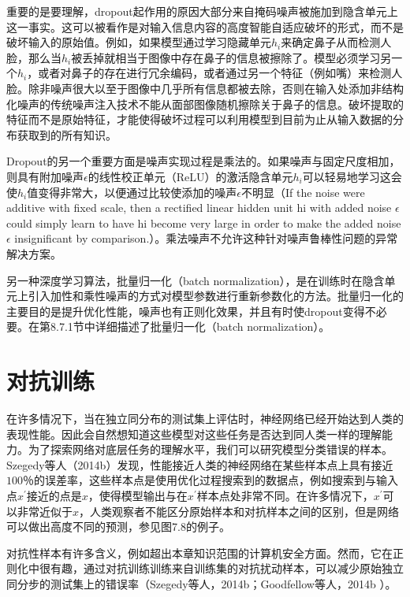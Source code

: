 重要的是要理解，dropout起作用的原因大部分来自掩码噪声被施加到隐含单元上这一事实。这可以被看作是对输入信息内容的高度智能自适应破坏的形式，而不是破坏输入的原始值。例如，如果模型通过学习隐藏单元$h_i$来确定鼻子从而检测人脸，那么当$h_i$被丢掉就相当于图像中存在鼻子的信息被擦除了。模型必须学习另一个$h_i$，或者对鼻子的存在进行冗余编码，或者通过另一个特征（例如嘴）来检测人脸。除非噪声很大以至于图像中几乎所有信息都被去除，否则在输入处添加非结构化噪声的传统噪声注入技术不能从面部图像随机擦除关于鼻子的信息。破坏提取的特征而不是原始特征，才能使得破坏过程可以利用模型到目前为止从输入数据的分布获取到的所有知识。

Dropout的另一个重要方面是噪声实现过程是乘法的。如果噪声与固定尺度相加，则具有附加噪声$\epsilon$的线性校正单元（ReLU）的激活隐含单元$h_i$可以轻易地学习这会使$h_i$值变得非常大，以便通过比较使添加的噪声$\epsilon$不明显（If the noise were additive with ﬁxed scale, then a rectiﬁed linear hidden unit hi with added noise $\epsilon$ could simply learn to have hi become very large in order to make the added noise $\epsilon$ insigniﬁcant by comparison.）。乘法噪声不允许这种针对噪声鲁棒性问题的异常解决方案。

另一种深度学习算法，批量归一化（batch normalization），是在训练时在隐含单元上引入加性和乘性噪声的方式对模型参数进行重新参数化的方法。批量归一化的主要目的是提升优化性能，噪声也有正则化效果，并且有时使dropout变得不必要。在第8.7.1节中详细描述了批量归一化（batch normalization）。

\section{对抗训练}

在许多情况下，当在独立同分布的测试集上评估时，神经网络已经开始达到人类的表现性能。因此会自然想知道这些模型对这些任务是否达到同人类一样的理解能力。为了探索网络对底层任务的理解水平，我们可以研究模型分类错误的样本。Szegedy等人（2014b）发现，性能接近人类的神经网络在某些样本点上具有接近$100％$的误差率，这些样本点是使用优化过程搜索到的数据点，例如搜索到与输入点$x^{'}$接近的点是$x$，使得模型输出与在$x^{'}$样本点处非常不同。在许多情况下，$x^{'}$可以非常近似于$x$，人类观察者不能区分原始样本和对抗样本之间的区别，但是网络可以做出高度不同的预测，参见图7.8的例子。

对抗性样本有许多含义，例如超出本章知识范围的计算机安全方面。然而，它在正则化中很有趣，通过对抗训练训练来自训练集的对抗扰动样本，可以减少原始独立同分步的测试集上的错误率（Szegedy等人，2014b；Goodfellow等人，2014b ）。

